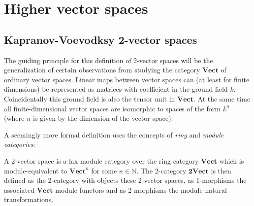 \section{Higher vector spaces}
\subsection{Kapranov-Voevodksy 2-vector spaces}

    The guiding principle for this definition of 2-vector spaces will be the generalization of certain observations from studying the category $\mathbf{Vect}$ of ordinary vector spaces. Linear maps between vector spaces can (at least for finite dimensions) be represented as matrices with coefficient in the ground field $k$. Coincidentally this ground field is also the tensor unit in $\mathbf{Vect}$. At the same time all finite-dimensional vector spaces are isomorphic to spaces of the form $k^n$ (where $n$ is given by the dimension of the vector space).


    A seemingly more formal definition uses the concepts of \textit{ring} and \textit{module categories}:
    \begin{adefinition}
        A 2-vector space is a lax module category over the ring category $\mathbf{Vect}$ which is module-equivalent to $\mathbf{Vect}^n$ for some $n\in\mathbb{N}$. The 2-category $\mathbf{2Vect}$ is then defined as the 2-category with objects these 2-vector spaces, as 1-morphisms the associated $\mathbf{Vect}$-module functors and as 2-morphisms the module natural transformations.
    \end{adefinition}


